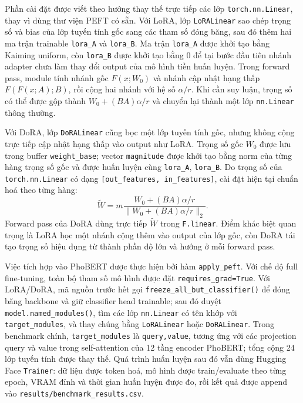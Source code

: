 \documentclass{article}
\theoremstyle{plain}
\theoremstyle{definition}
\begin{document}
Phần cài đặt được viết theo hướng thay thế trực tiếp các lớp \texttt{torch.nn.Linear}, thay vì dùng thư viện PEFT có sẵn. Với LoRA, lớp \texttt{LoRALinear} sao chép trọng số và bias của lớp tuyến tính gốc sang các tham số đóng băng, sau đó thêm hai ma trận trainable \texttt{lora\_A} và \texttt{lora\_B}. Ma trận \texttt{lora\_A} được khởi tạo bằng Kaiming uniform, còn \texttt{lora\_B} được khởi tạo bằng 0 để tại bước đầu tiên nhánh adapter chưa làm thay đổi output của mô hình tiền huấn luyện. Trong forward pass, module tính nhánh gốc $F(x; W_0)$ và nhánh cập nhật hạng thấp $F(F(x; A); B)$, rồi cộng hai nhánh với hệ số $\alpha/r$. Khi cần suy luận, trọng số có thể được gộp thành $W_0 + (BA)\alpha/r$ và chuyển lại thành một lớp \texttt{nn.Linear} thông thường.

Với DoRA, lớp \texttt{DoRALinear} cũng bọc một lớp tuyến tính gốc, nhưng không cộng trực tiếp cập nhật hạng thấp vào output như LoRA. Trọng số gốc $W_0$ được lưu trong buffer \texttt{weight\_base}; vector \texttt{magnitude} được khởi tạo bằng norm của từng hàng trọng số gốc và được huấn luyện cùng \texttt{lora\_A}, \texttt{lora\_B}. Do trọng số của \texttt{torch.nn.Linear} có dạng \texttt{[out\_features, in\_features]}, cài đặt hiện tại chuẩn hoá theo từng hàng:
\begin{equation}
\tilde{W} = m \frac{W_0 + (BA)\alpha/r}{\|W_0 + (BA)\alpha/r\|_2}.
\end{equation}
Forward pass của DoRA dùng trực tiếp $\tilde{W}$ trong \texttt{F.linear}. Điểm khác biệt quan trọng là LoRA học một nhánh cộng thêm vào output của lớp gốc, còn DoRA tái tạo trọng số hiệu dụng từ thành phần độ lớn và hướng ở mỗi forward pass.

Việc tích hợp vào PhoBERT được thực hiện bởi hàm \texttt{apply\_peft}. Với chế độ full fine-tuning, toàn bộ tham số mô hình được đặt \texttt{requires\_grad=True}. Với LoRA/DoRA, mã nguồn trước hết gọi \texttt{freeze\_all\_but\_classifier()} để đóng băng backbone và giữ classifier head trainable; sau đó duyệt \texttt{model.named\_modules()}, tìm các lớp \texttt{nn.Linear} có tên khớp với \texttt{target\_modules}, và thay chúng bằng \texttt{LoRALinear} hoặc \texttt{DoRALinear}. Trong benchmark chính, \texttt{target\_modules} là \texttt{query,value}, tương ứng với các projection query và value trong self-attention của 12 tầng encoder PhoBERT; tổng cộng 24 lớp tuyến tính được thay thế. Quá trình huấn luyện sau đó vẫn dùng Hugging Face \texttt{Trainer}: dữ liệu được token hoá, mô hình được train/evaluate theo từng epoch, VRAM đỉnh và thời gian huấn luyện được đo, rồi kết quả được append vào \texttt{results/benchmark\_results.csv}.
\end{document}
